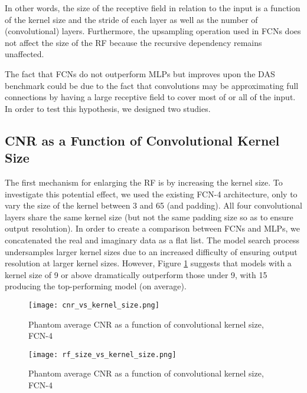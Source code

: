 In other words, the size of the receptive field in relation to the input is a function of the kernel size and the stride of each layer as well as the number of (convolutional) layers. Furthermore, the upsampling operation used in FCNs does not affect the size of the RF because the recursive dependency remains unaffected.

The fact that FCNs do not outperform MLPs but improves upon the DAS benchmark could be due to the fact that convolutions may be approximating full connections by having a large receptive field to cover most of or all of the input. In order to test this hypothesis, we designed two studies.

\subsection{CNR as a Function of Convolutional Kernel Size}
The first mechanism for enlarging the RF is by increasing the kernel size. To investigate this potential effect, we used the existing FCN-4 architecture, only to vary the size of the kernel between 3 and 65 (and padding). All four convolutional layers share the same kernel size (but not the same padding size so as to ensure output resolution). In order to create a comparison between FCNs and MLPs, we concatenated the real and imaginary data as a flat list. The model search process undersamples larger kernel sizes due to an increased difficulty of ensuring output resolution at larger kernel sizes. However, Figure \ref{fig:cnr_vs_kernel_size} suggests that models with a kernel size of 9 or above dramatically outperform those under 9, with 15 producing the top-performing model (on average).

\begin{figure}[htbp]
  \centerline{\texttt{[image: cnr\_vs\_kernel\_size.png]}}
  \caption{Phantom average CNR as a function of convolutional kernel size, FCN-4}
  \label{fig:cnr_vs_kernel_size}
\end{figure}

\begin{figure}[htbp]
  \centerline{\texttt{[image: rf\_size\_vs\_kernel\_size.png]}}
  \caption{Phantom average CNR as a function of convolutional kernel size, FCN-4}
  \label{fig:rf_size_vs_kernel_size}
\end{figure}


